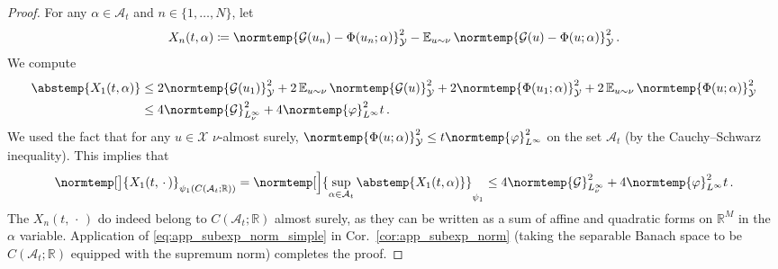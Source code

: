 \documentclass{article}
\theoremstyle{plain}
\theoremstyle{my_def}
\theoremstyle{my_rem}
\numberwithin{equation}{section}
\numberwithin{theorem}{section}%
\newcommand{\R}{\mathbb{R}}
\newcommand{\E}{\mathbb{E}}
\newcommand{\cA}{\mathcal{A}}
\newcommand{\cG}{\mathcal{G}}
\newcommand{\cX}{\mathcal{X}}
\newcommand{\cY}{\mathcal{Y}}
\newcommand{\norm}{\normtemp}
\newcommand{\abs}{\abstemp}
\newcommand{\slot}{{\,\cdot\,}}
\newcommand{\defeq}{\coloneqq} %
\renewcommand{\E}{\operatorname{\mathbb{E}}} %
\renewcommand{\phi}{\varphi}
\begin{document}
\begin{proof}
    For any $\alpha\in\cA_t$ and $n\in\{1,\ldots, N\}$, let
    \begin{equation*}
            X_n(t,\alpha)\defeq \norm{\cG(u_n)-\Phi(u_n;\alpha)}_\cY^2 - \E_{u\sim\nu}\norm{\cG(u)-\Phi(u;\alpha)}_\cY^2\,.
    \end{equation*}
    We compute
    \begin{align*}
        \abs{X_1(t,\alpha)}&\leq 2\norm{\cG(u_1)}_\cY^2 + 2\E_{u\sim\nu}\norm{\cG(u)}_\cY^2 + 2\norm{\Phi(u_1;\alpha)}_{\cY}^2 + 2\E_{u\sim\nu}\norm{\Phi(u;\alpha)}_{\cY}^2\\
        &\leq 4\norm{\cG}_{L^\infty_\nu}^2 + 4\norm{\phi}_{L^\infty}^2t\,.
    \end{align*}
    We used the fact that for any $u\in\cX$ $\nu$-almost surely, $\norm{\Phi(u;\alpha)}_{\cY}^2\leq t\norm{\phi}_{L^\infty}^2$ on the set $\cA_t$ (by the Cauchy--Schwarz inequality). This implies that
    \begin{equation*}
            \norm[\big]{X_1(t,\slot)}_{\psi_1(C(\cA_t;\R))}=\norm[\Big]{\sup_{\alpha\in\cA_t}\abs{X_1(t,\alpha)}}_{\psi_1}\leq 4\norm{\cG}_{L^\infty_\nu}^2 + 4\norm{\phi}_{L^\infty}^2t\, .
    \end{equation*}
    The $X_n(t,\slot)$ do indeed belong to $C(\cA_t;\R)$ almost surely, as they can be written as a sum of affine and quadratic forms on $\R^M$ in the $\alpha$ variable. Application of \eqref{eq:app_subexp_norm_simple} in Cor.~\ref{cor:app_subexp_norm} (taking the separable Banach space to be $C(\cA_t;\R)$ equipped with the supremum norm) completes the proof.
\end{proof}
\end{document}

